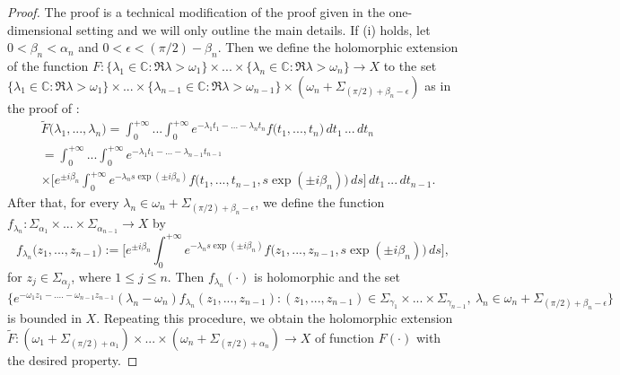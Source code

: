 \documentclass{amsart}
\theoremstyle{definition}
\theoremstyle{remark}
\numberwithin{equation}{section}
\begin{document}
\begin{proof}
The proof is a technical modification of the proof given in the one-dimensional setting and we will only outline the main details. If  (i) holds, let $0<\beta_{n}<\alpha_{n}$ and $0<\epsilon<(\pi/2)-\beta_{n}$. Then we define the holomorphic extension of the function $F : \{\lambda_{1}\in {\mathbb C} : \Re \lambda>\omega_{1}\} \times ... \times \{\lambda_{n}\in {\mathbb C} : \Re \lambda>\omega_{n}\} \rightarrow X$ to the set $\{\lambda_{1}\in {\mathbb C} : \Re \lambda>\omega_{1}\} \times ... \times \{\lambda_{n-1}\in {\mathbb C} : \Re \lambda>\omega_{n-1}\} \times (\omega_{n}+\Sigma_{(\pi/2)+\beta_{n}-\epsilon})$ as in the proof of \cite[Theorem 2.6.1]{a43}:
\begin{align*} 
& \tilde{F}\bigl(\lambda_{1},...,\lambda_{n}\bigr)=\int^{+\infty}_{0}...\int^{+\infty}_{0}e^{-\lambda_{1}t_{1}-...-\lambda_{n}t_{n}}f\bigl(t_{1},...,t_{n}\bigr)\, dt_{1}\, ...\, dt_{n}
\\& = \int^{+\infty}_{0}...\int^{+\infty}_{0}e^{-\lambda_{1}t_{1}-...-\lambda_{n-1}t_{n-1}}
\\& \times \Biggl[e^{\pm i \beta_{n}}\int^{+\infty}_{0}e^{-\lambda_{n}s\exp(\pm i\beta_{n})}f\bigl(t_{1},...,t_{n-1},s\exp(\pm i\beta_{n})\bigr)\, ds\Biggr]\, dt_{1}\, ...\, dt_{n-1}.
\end{align*}
After that, for every $\lambda_{n}\in \omega_{n}+\Sigma_{(\pi/2)+\beta_{n}-\epsilon}$, we define the function $f_{\lambda_{n}} : \Sigma_{\alpha_{1}}\times ... \times \Sigma_{\alpha_{n-1}}\rightarrow X$ by
$$
f_{\lambda_{n}}\bigl(z_{1},...,z_{n-1}\bigr):=\Biggl[e^{\pm i \beta_{n}}\int^{+\infty}_{0}e^{-\lambda_{n}s\exp(\pm i\beta_{n})}f\bigl(z_{1},...,z_{n-1},s\exp(\pm i\beta_{n})\bigr)\, ds\Biggr],
$$
for $z_{j}\in \Sigma_{\alpha_{j}}$, where $1\leq j\leq n.$ 
Then $f_{\lambda_{n}}(\cdot)$ is holomorphic and the set\\
 $\{ e^{-\omega_{1}z_{1}-....-\omega_{n-1}z_{n-1}}(\lambda_{n}-\omega_{n})f_{\lambda_{n}}(z_{1},...,z_{n-1}) : (z_{1},...,z_{n-1})\in \Sigma_{\gamma_{1}} \times ... \times \Sigma_{\gamma_{n-1}},\ \lambda_{n}\in \omega_{n}+\Sigma_{(\pi/2)+\beta_{n}-\epsilon} \}$ is bounded in $X.$ Repeating this procedure, we obtain the holomorphic extension 
 $\tilde{F} : (\omega_{1}+\Sigma_{(\pi/2)+\alpha_{1}}) \times ... \times (\omega_{n}+\Sigma_{(\pi/2)+\alpha_{n}})\rightarrow X$ of function $F(\cdot)$ with the desired property.  


\end{proof}
\end{document}
